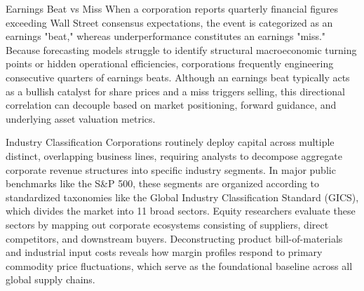 \documentclass[10pt]{article}
\begin{document}
    \begin{core}{Earnings Beat vs Miss}
      When a corporation reports quarterly financial figures exceeding Wall Street consensus expectations, the event is categorized as an earnings "beat," whereas underperformance constitutes an earnings "miss." Because forecasting models struggle to identify structural macroeconomic turning points or hidden operational efficiencies, corporations frequently engineering consecutive quarters of earnings beats. Although an earnings beat typically acts as a bullish catalyst for share prices and a miss triggers selling, this directional correlation can decouple based on market positioning, forward guidance, and underlying asset valuation metrics.
    \end{core}

    \begin{core}{Industry Classification}
      Corporations routinely deploy capital across multiple distinct, overlapping business lines, requiring analysts to decompose aggregate corporate revenue structures into specific industry segments. In major public benchmarks like the S&P 500, these segments are organized according to standardized taxonomies like the Global Industry Classification Standard (GICS), which divides the market into 11 broad sectors. Equity researchers evaluate these sectors by mapping out corporate ecosystems consisting of suppliers, direct competitors, and downstream buyers. Deconstructing product bill-of-materials and industrial input costs reveals how margin profiles respond to primary commodity price fluctuations, which serve as the foundational baseline across all global supply chains.
    \end{core}
\end{document}
